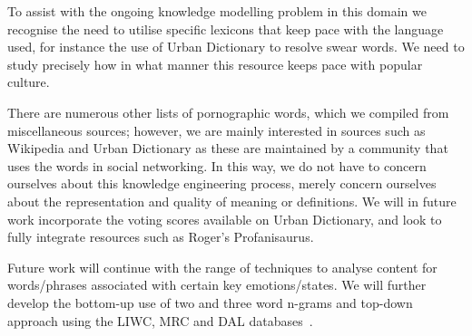 \documentclass[letterpaper]{article}
\begin{document}
To assist with the ongoing knowledge modelling problem in this domain
we recognise the need to utilise specific lexicons that keep pace with
the language used, for instance the use of Urban Dictionary to resolve
swear words. We need to study precisely how in what manner this
resource keeps pace with popular culture.

There are numerous other lists of pornographic words, which we
compiled from miscellaneous sources; however, we are mainly interested
in sources such as Wikipedia and Urban Dictionary as these are
maintained by a community that uses the words in social networking. In
this way, we do not have to concern ourselves about this knowledge
engineering process, merely concern ourselves about the representation
and quality of meaning or definitions. We will in future work
incorporate the voting scores available on Urban Dictionary, and look
to fully integrate resources such as Roger's Profanisaurus.

Future work will continue with the range of techniques to analyse
content for words/phrases associated with certain key
emotions/states. We will further develop the bottom-up use of two and
three word n-grams and top-down approach using the LIWC, MRC and DAL
databases~\cite{iacobelli-et-al:2011}.




\end{document}
